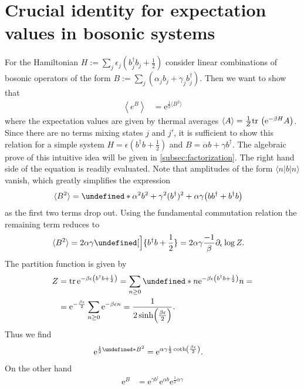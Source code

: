 \documentclass[english, parskip=full]{scrartcl}
\makeatletter
\DeclarePairedDelimiter\kla{(}{)}
\let\bra\undefined
\let\braket\undefined
\DeclarePairedDelimiter\bra{\langle}{\rangle}
\newcommand{\e}{\text{e}}
\newcommand{\Text}[1]{\text{#1}}    %
\newcommand{\powe}[1]{\e^{#1}}
\makeatother
\begin{document}
\section{Crucial identity for expectation values in bosonic systems}
For the Hamiltonian $H := \sum_j \epsilon_j \left( b_j^\dagger b_j + \frac{1}{2} \right)$ consider linear combinations of bosonic operators of the form $B := \sum_j \left( \alpha_j b_j + \gamma_j b_j^\dagger \right)$.
Then we want to show that 
\begin{align}
\left\langle e^B \right\rangle &= \e^{\frac{1}{2} \langle B^2 \rangle}
\end{align}
where the expectation values are given by thermal averages $\langle A  \rangle= \frac{1}{Z} \text{tr\,} \left( \e^{-\beta H}A \right) $.
Since there are no terms mixing states $j$ and $j'$, it is sufficient to show this relation for a simple system $H=\epsilon \left(b^\dagger b+\frac{1}{2} \right)$ and $B=\alpha b + \gamma b^\dagger$.
The algebraic prove of this intuitive idea will be given in \autoref{subsec:factorization}.
The right hand side of the equation is readily evaluated.
Note that amplitudes of the form $\langle n | b | n \rangle$ vanish, which greatly simplifies the expression
\begin{align}
\langle B^2 \rangle &= \bra*{\alpha^2b^2 + \gamma^2(b^\dagger)^2 + \alpha\gamma \kla*{bb^\dagger + b^\dagger b}}
\end{align}
as the first two terms drop out.
Using the fundamental commutation relation the remaining term reduces to
\begin{align}
\langle B^2 \rangle &= 2\alpha\gamma \bra[\Big ]{ b^\dagger b + \frac{1}{2}} = 2\alpha\gamma \frac{-1}{\beta}\partial_\epsilon \log Z.
\end{align}
The partition function is given by
\begin{align}
Z &= \Text{tr\,} \e^{-\beta\epsilon \kla*{b^\dagger b + \frac{1}{2}}} = \sum_{n\ge 0} \braket*{n}{\e^{-\beta\epsilon \kla*{b^\dagger b + \frac{1}{2}}}}{n} = \\
&= \e^{-\frac{\beta\epsilon}{2}} \sum_{n\ge 0} \e^{-\beta\epsilon n} = \frac{1}{2\sinh\kla*{\frac{\beta\epsilon}{2}}}.
\end{align}
Thus we find
\begin{align}
\powe{\frac{1}{2} \bra*{B^2}} &= \powe{\alpha\gamma \frac{1}{2} \coth\kla*{\frac{\beta\epsilon}{2}}}.
\end{align}
On the other hand
\begin{align}
\powe{B} &=  \powe{\gamma b^\dagger} \powe{\alpha b}\powe{\frac{1}{2}\alpha\gamma}
\end{align}
\end{document}
